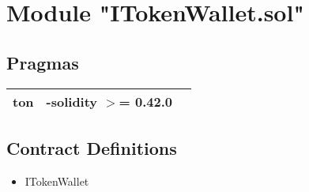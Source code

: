 
\section{Module "ITokenWallet.sol"}


\subsection{Pragmas}


\noindent\begin{tabular}{|l|l|p{5cm}|}\hline
ton & -solidity $>$= 0.42.0 &\\\hline
\end{tabular}


\subsection{Contract Definitions}

\begin{itemize}
\item ITokenWallet
\end{itemize}
